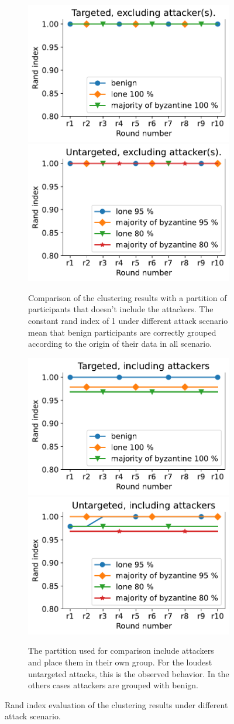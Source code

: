 \begin{figure}
  \centering 
    \hfill 
  \begin{subfigure}{\columnwidth}
    \centering 
    \includegraphics[width=0.45\linewidth]{figures/clustering/targeted_rand_no_attackers.pdf}
    \includegraphics[width=0.45\linewidth]{figures/clustering/untargeted_rand_no_attacker.pdf}
    
    \caption{Comparison of the clustering results with a partition of participants that doesn't include the attackers. The constant rand index of 1 under different attack scenario mean that benign participants are correctly grouped according to the origin of their data in all scenario.}
    \label{fig:rand_no_attackers}
  \end{subfigure}
  \hfill 
    \begin{subfigure}{\columnwidth}
    \centering 
    \includegraphics[width=0.45\linewidth]{figures/clustering/targeted_rand_attackers_separated.pdf}
    \includegraphics[width=0.45\linewidth]{figures/clustering/untargeted_rand_attackers_separated.pdf}
    \caption{The partition used for comparison include attackers and place them in their own group. For the loudest untargeted attacks, this is the observed behavior. In the others cases attackers are grouped with benign. }
    \label{fig:rand_attackers_separated}
  \end{subfigure}
  \hfill  
  \caption{Rand index evaluation of the clustering results under different attack scenario.}
  \label{fig:rand_clustering}
\end{figure}
